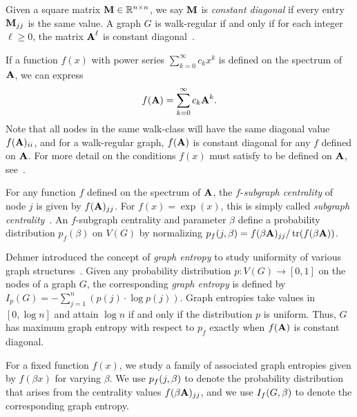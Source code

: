 \noindent Given a square matrix $\textbf{M} \in \mathbb{R}^{n \times n}$, we say $\textbf{M}$ is \emph{constant diagonal} if every entry $\textbf{M}_{jj}$ is the same value.
A graph $G$ is walk-regular if and only if for each integer $\ell \geq 0$, the matrix $\textbf{A}^{\ell}$ is constant diagonal~\cite{godsil2013algebraic}.


If a function $f(x)$ with power series $\sum_{k=0}^{\infty} c_k x^k$ is defined on the spectrum of $\textbf{A}$, we can express
\[
    f(\textbf{A}) = \sum_{k=0}^{\infty} c_k \textbf{A}^k.
\]
Note that all nodes in the same walk-class will have the same diagonal value $f(\textbf{A})_{ii}$,
and for a walk-regular graph, $f(\textbf{A})$ is constant diagonal for any $f$ defined on $\textbf{A}$.
For more detail on the conditions $f(x)$ must satisfy to be defined on $\textbf{A}$, see~\cite{higham2008functions}.

For any function $f$ defined on the spectrum of $\textbf{A}$, the $f$-\emph{subgraph centrality} of node $j$ is given by $f(\textbf{A})_{jj}$.
For $f(x) = \exp(x)$, this is simply called \emph{subgraph centrality}~\cite{estrada2005subgraph}.
An $f$-subgraph centrality and parameter $\beta$ define a probability distribution $p_f(\beta)$ on $V(G)$ by normalizing $p_{f}(j,\beta) = f(\beta\textbf{A})_{jj} / \operatorname{tr}( f(\beta\textbf{A}) )$.

Dehmer introduced the concept of \emph{graph entropy} to study uniformity of various graph structures~\cite{dehmer2008information}.
Given any probability distribution $p:V(G)\rightarrow [0,1]$ on the nodes of a graph $G$, the corresponding \emph{graph entropy} is defined by $I_p(G) = - \sum_{j=1}^n \left( p(j) \cdot \log p(j) \right)$.
Graph entropies take values in $[0, \log n]$ and attain $\log n$ if and only if the distribution $p$ is uniform.
Thus, $G$ has maximum graph entropy with respect to $p_f$ exactly when $f(\textbf{A})$ is constant diagonal.

For a fixed function $f(x)$, we study a family of associated graph entropies given by $f(\beta x)$
for varying $\beta$.
We use $p_{f}(j,\beta)$ to denote the probability distribution that arises from the centrality values $f(\beta \textbf{A})_{jj}$, and we use $I_{f}(G, \beta)$ to denote the corresponding graph entropy.

